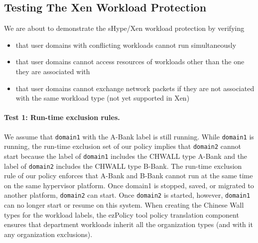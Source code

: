 \documentclass[11pt,twoside,final,openright]{report}
\begin{document}
\subsection{Testing The Xen Workload Protection}
\label{subsection:acmexampletest}

We are about to demonstrate the sHype/Xen workload protection by verifying
\begin{itemize}
\item that user domains with conflicting workloads cannot run
  simultaneously
\item that user domains cannot access resources of workloads other than the
	one they are associated with
\item that user domains cannot exchange network packets if they are not
  associated with the same workload type (not yet supported in Xen)
\end{itemize}

\paragraph{Test 1: Run-time exclusion rules.} We assume that \verb|domain1|
with the A-Bank label is still running. While \verb|domain1| is running,
the run-time exclusion set of our policy implies that \verb|domain2| cannot
start because the label of \verb|domain1| includes the CHWALL type A-Bank
and the label of \verb|domain2| includes the CHWALL type B-Bank. The
run-time exclusion rule of our policy enforces that A-Bank and
B-Bank cannot run at the same time on the same hypervisor platform.
Once domain1 is stopped, saved, or migrated to another platform,
\verb|domain2| can start. Once \verb|domain2| is started, however,
\verb|domain1| can no longer start or resume on this system. When creating the
Chinese Wall types for the workload labels, the ezPolicy tool policy
translation component ensures that department workloads inherit all the
organization types (and with it any organization exclusions).
\end{document}
